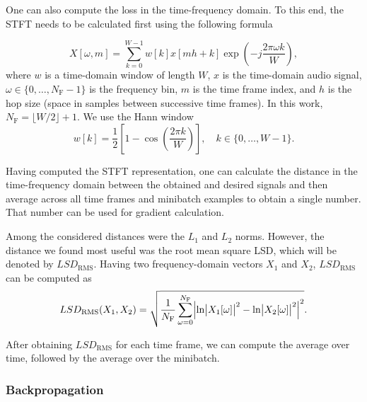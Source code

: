 One can also compute the loss in the time-frequency domain. To this end, the \ac{STFT} needs to be calculated first using the following formula \cite{Pytorch}

\begin{equation}
  X[\omega, m] = \sum \limits_{k=0}^{W-1} w[k] x[mh + k] \exp \left( -j\frac{2\pi \omega k}{W} \right),
\end{equation}
where $w$ is a time-domain window of length $W$, $x$ is the time-domain audio signal, $\omega \in \{0, \dots, N_\text{F}-1\}$ is the frequency bin, $m$ is the time frame index, and $h$ is the hop size (space in samples between successive time frames). In this work, $N_\text{F} = \lfloor W / 2 \rfloor + 1$. We use the Hann window \cite{Oppenheim2010}
\begin{equation}
  w[k] = \frac{1}{2} \left[ 1 - \cos \left( \frac{2\pi k}{W} \right) \right], \quad k \in \{0, \dots, W-1\}.
\end{equation}

Having computed the \ac{STFT} representation, one can calculate the distance in the time-frequency domain between the obtained and desired signals and then average across all time frames and minibatch examples to obtain a single number. That number can be used for gradient calculation.

Among the considered distances were the $L_1$ and $L_2$ norms. However, the distance we found most useful was the root mean square \ac{LSD}, which will be denoted by $LSD_\text{RMS}$. Having two frequency-domain vectors $X_1$ and $X_2$, $LSD_\text{RMS}$ can be computed as \cite{Gray1976}
\begin{equation}
  LSD_\text{RMS}(X_1, X_2) = \sqrt{ \frac{1}{N_\text{F}} \sum \limits_{\omega=0}^{N_\text{F}} \Bigl\lvert \ln \bigl\lvert X_1[\omega]\bigr\rvert^2 - \ln \bigl\lvert X_2[\omega]\bigr\rvert^2 \Bigr\rvert^2}.
  \label{eq:log_spectral_distance}
\end{equation}

After obtaining $LSD_\text{RMS}$ for each time frame, we can compute the average over time, followed by the average over the minibatch.

\subsubsection{Backpropagation}
\label{sec:backpropagation}


